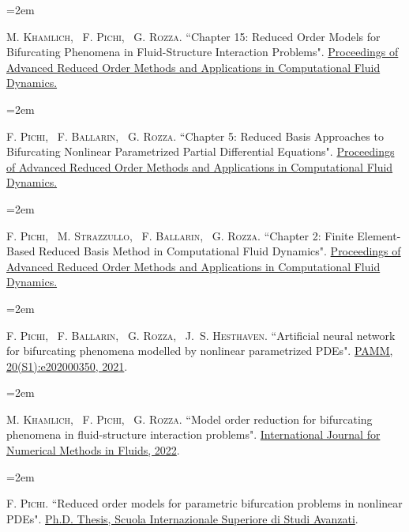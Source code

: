 \documentclass{scrartcl}
\newcommand{\MarginText}[1]{\marginpar{\raggedleft\itshape\small#1}} %
\newlength{\datebox}\settowidth{\datebox}{Spring 2011} %
\newcommand{\NewEntry}[3]{\noindent\hangindent=2em\hangafter=0 \parbox{\datebox}{\small \textit{#1}}\hspace{1.5em} #2 #3 %
\vspace{0.5em}} %
\newcommand{\Description}[1]{\hangindent=2em\hangafter=0\noindent\raggedright\footnotesize{#1}\par\normalsize\vspace{1em}} %
\begin{document}
\begin{cv}{}
\Description{\MarginText{[11]}M. \textsc{Khamlich}, ~F. \textsc{Pichi}, ~G. \textsc{Rozza.} {\color{blue} ``Chapter 15: Reduced Order Models for Bifurcating Phenomena in Fluid-Structure Interaction Problems".} \href{https://epubs.siam.org/doi/10.1137/1.9781611977257.ch15}{Proceedings of Advanced Reduced Order Methods and Applications in Computational Fluid Dynamics.}}

\newpage
\Description{\MarginText{[10]}F. \textsc{Pichi}, ~F. \textsc{Ballarin}, ~G. \textsc{Rozza.} {\color{blue} ``Chapter 5: Reduced Basis Approaches to Bifurcating Nonlinear Parametrized Partial Differential Equations".} \href{https://epubs.siam.org/doi/10.1137/1.9781611977257.ch5}{Proceedings of Advanced Reduced Order Methods and Applications in Computational Fluid Dynamics.}}


\Description{\MarginText{[9]}F. \textsc{Pichi}, ~M. \textsc{Strazzullo}, ~F. \textsc{Ballarin}, ~G. \textsc{Rozza.} {\color{blue} ``Chapter 2: Finite Element-Based Reduced Basis Method in Computational Fluid Dynamics".} \href{https://epubs.siam.org/doi/10.1137/1.9781611977257.ch2}{Proceedings of Advanced Reduced Order Methods and Applications in Computational Fluid Dynamics.}}


\Description{\MarginText{[8]}F. \textsc{Pichi}, ~F. \textsc{Ballarin}, ~G. \textsc{Rozza}, ~J.~S. \textsc{Hesthaven.} {\color{blue} ``Artificial neural network for bifurcating phenomena modelled by nonlinear parametrized PDEs".} \href{https://onlinelibrary.wiley.com/doi/abs/10.1002/pamm.202000350}{PAMM, 20(S1):e202000350, 2021}.}

\Description{\MarginText{[7]}M. \textsc{Khamlich}, ~F. \textsc{Pichi}, ~G. \textsc{Rozza.} {\color{blue} ``Model order reduction for bifurcating phenomena in fluid-structure interaction problems".} \href{https://onlinelibrary.wiley.com/doi/abs/10.1002/fld.5118}{International Journal for Numerical Methods in Fluids, 2022}.}




\Description{\MarginText{[6]}F. \textsc{Pichi.} {\color{blue} ``Reduced order models for parametric bifurcation
problems in nonlinear {PDE}s".} \href{https://iris.sissa.it/handle/20.500.11767/114329}{Ph.D. Thesis, Scuola Internazionale Superiore di Studi Avanzati}.}




\end{cv}
\end{document}
